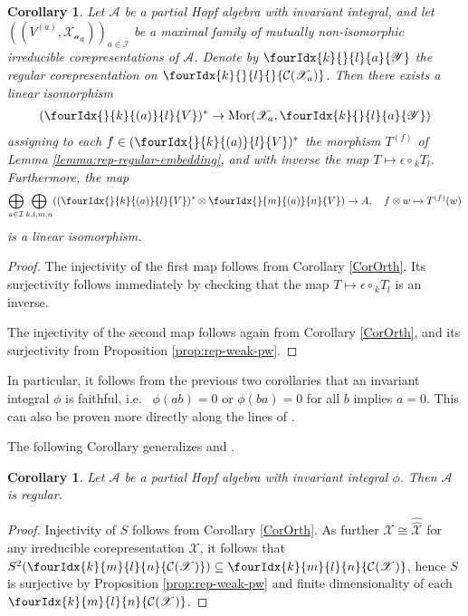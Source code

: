 \documentclass[10pt]{article}
\newcommand{\dual}[1]{#1^{*}}
\newcommand{\Mor}{\mathrm{Mor}}
\newcommand{\GrDA}[3]{{}_{#2}#1_{#3}} %
\newcommand{\Gr}[5]{\fourIdx{#2}{#4}{#3}{#5}{#1}}%
\newcommand{\Grd}[3]{\Gr{#1}{#2}{#3}{}{}}
\newtheorem{Cor}[Theorem]{Corollary}
\theoremstyle{definition}
\numberwithin{equation}{section}
\begin{document}
\begin{Cor} \label{cor:rep-pw}
  Let $\mathscr{A}$ be a partial Hopf algebra with invariant integral, and let
  $((V^{(a)},\mathscr{X_{a}}_{a}))_{a \in \mathcal{I}}$ be a maximal family of mutually non-isomorphic irreducible corepresentations of
  $\mathscr{A}$. Denote by $\Gr{\mathscr{Y}}{k}{l}{}{a}$
  the regular corepresentation on
  $\Grd{\mathcal{C}(\mathscr{X}_a)}{k}{l}$. Then there exists a
  linear isomorphism
  \begin{align*}
    \dual{( \Gr{V}{}{(a)}{k}{l})} \to
    \Mor(\mathscr{X}_{a},
    \Gr{\mathscr{Y}}{k}{l}{}{a})
  \end{align*}
  assigning to each $f\in     \dual{( \Gr{V}{}{(a)}{k}{l})}$ the morphism
  $T^{(f)}$ of Lemma \ref{lemma:rep-regular-embedding}, and with inverse the map $T \mapsto \epsilon \circ \GrDA{T}{k}{l}$. Furthermore, the map  
  \begin{align*}
    \bigoplus_{a \in \mathcal{I}} \bigoplus_{k,l,m,n}
    (\dual{(\Gr{V}{}{(a)}{k}{l})} \otimes
    \Gr{V}{}{(a)}{m}{n}) \to A,\quad f \otimes w \mapsto T^{(f)}(w)
  \end{align*}
  is a linear isomorphism. 
\end{Cor}
\begin{proof} The injectivity of the first map follows from Corollary \ref{CorOrth}. Its surjectivity follows immediately by checking that the map $T \mapsto \epsilon \circ \GrDA{T}{k}{l}$ is an inverse. 

The injectivity of the second map follows again from Corollary \ref{CorOrth}, and its surjectivity from Proposition \ref{prop:rep-weak-pw}.
\end{proof}

In particular, it follows from the previous two corollaries that an invariant integral $\phi$ is faithful, i.e.~ $\phi(ab)=0$ or $\phi(ba)=0$ for all $b$ implies $a=0$. This can also be proven more directly along the lines of \cite[Proposition 3.4]{VDae2}.

The following Corollary generalizes \cite[Theorem 3.3]{Lar1} and \cite[Corollary 3.6]{Hay1}.

\begin{Cor} Let $\mathscr{A}$ be a partial Hopf algebra with invariant integral $\phi$. Then $\mathscr{A}$ is regular.
\end{Cor}

\begin{proof} Injectivity of $S$ follows from Corollary \ref{CorOrth}. As further $\mathscr{X} \cong \hat{\hat{\mathscr{X}}}$ for any irreducible corepresentation $\mathscr{X}$, it follows that $S^2(\Gr{\mathcal{C}(\mathscr{X})}{k}{l}{m}{n}) \subseteq \Gr{\mathcal{C}(\mathscr{X})}{k}{l}{m}{n}$, hence $S$ is surjective by Proposition \ref{prop:rep-weak-pw} and finite dimensionality of each  $\Gr{\mathcal{C}(\mathscr{X})}{k}{l}{m}{n}$.
\end{proof} 
\end{document}
